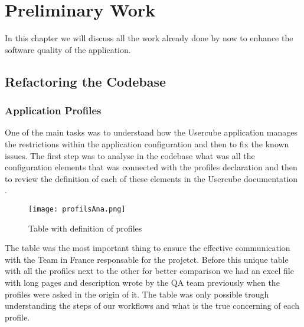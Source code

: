 %

\chapter{Preliminary Work}
\label{Preliminary Work}

In this chapter we will discuss all the work already done by now to enhance the software quality of the application.

\section{Refactoring the Codebase}

\subsection{Application Profiles}

One of the main tasks was to understand how the Usercube application manages the restrictions within the application configuration and then to fix the known issues. The first step was to analyse in the codebase what was all the configuration elements that was connected with the profiles declaration and then to review the definition of each of these elements in the Usercube documentation \cite{UsercubeDocument}.




\begin{figure}
    \centering
    \texttt{[image: profilsAna.png]}
    \caption{Table with definition of profiles}
    \label{fig:enter-label}
\end{figure}

The table was the most important thing to ensure the effective communication with the Team in France responsable for the projetct. Before this unique table with all the profiles next to the other for better comparison we had an excel file with long pages and description wrote by the QA team previously when the profiles were asked in the origin of it. The table was only possible trough understanding the steps of our workflows and what is the true concerning of each profile.

